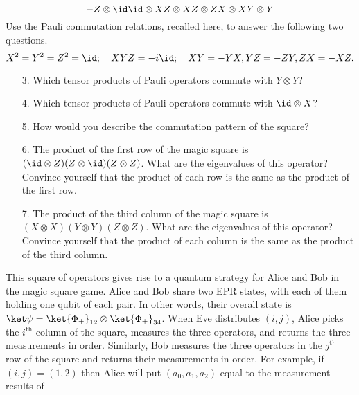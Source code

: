 \begin{exercises}
\begin{equation*}
	{-Z\otimes \id} {\id\otimes X} {Z\otimes X}
	{ Z\otimes Z} {X\otimes X} {Y\otimes Y}
\end{equation*}
Use the Pauli commutation relations, recalled here, to answer the following two questions.
\begin{equation*}
	X^2 = Y^2 = Z^2 = \id;\quad XYZ = -i\id; \quad XY = - YX, YZ = - ZY, ZX = -XZ.
\end{equation*}
\begin{enumerate}
\item[3.] Which tensor products of Pauli operators commute with $Y\otimes Y$?
\item[4.] Which tensor products of Pauli operators commute with $\id\otimes X$?
\item[5.] How would you describe the commutation pattern of the square?
\item[6.] The product of the first row of the magic square is $({\id\otimes Z})({ Z\otimes \id})({Z\otimes Z})$. What are the eigenvalues of this operator? Convince yourself that the product of each row is the same as the product of the first row.
\item[7.] The product of the third column of the magic square is $({X\otimes X})({Y\otimes Y})({Z\otimes Z})$. What are the eigenvalues of this operator? Convince yourself that the product of each column is the same as the product of the third column.
\end{enumerate}
This square of operators gives rise to a quantum strategy for Alice and Bob in the magic square game. Alice and Bob share two EPR states, with each of them holding one qubit of each pair. In other words, their overall state is $\ket\psi = \ket{\Phi_+}_{12}\otimes\ket{\Phi_+}_{34}$. When Eve distributes $(i,j)$, Alice picks the $i^\text{th}$ column of the square, measures the three operators, and returns the three measurements in order. Similarly, Bob measures the three operators in the $j^\text{th}$ row of the square and returns their measurements in order. For example, if $(i,j) = (1,2)$ then Alice will put $(a_0,a_1,a_2)$ equal to the measurement results of

\end{exercises}

